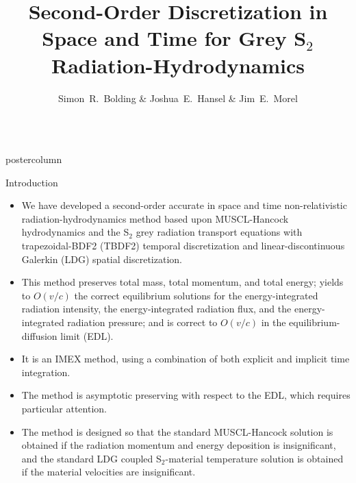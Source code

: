 \documentclass[xcolor=dvipsnames]{beamer}
\title{Second-Order Discretization in Space and Time for Grey S$_2$ Radiation-Hydrodynamics}
\author{\large Simon~R.~Bolding \& Joshua~E.~Hansel \& Jim~E.~Morel}
\institute{Department of Nuclear Engineering,
Texas A\&M University,
College Station, TX, USA 77843}
\newlength{\columnheight}
\begin{document}
\begin{frame}
\begin{columns}

\begin{column}{.49\textwidth}
\begin{beamercolorbox}[center,wd=\textwidth]{postercolumn}
\begin{minipage}[T]{0.95\textwidth} %
\parbox[t][\columnheight]{\textwidth}{ %
\begin{block}{Introduction}       
\begin{itemize}
\setlength{\itemsep}{0.2em}
\item We have developed a second-order accurate in space and time non-relativistic radiation-hydrodynamics method based upon 
MUSCL-Hancock hydrodynamics and the S$_2$ grey radiation transport equations with trapezoidal-BDF2 (TBDF2) temporal  
discretization and linear-discontinuous Galerkin (LDG) spatial discretization.
\item This method preserves total mass, total momentum, and total energy; yields to $O(v/c)$ the correct equilibrium solutions 
for the energy-integrated radiation intensity, the energy-integrated radiation flux, and the energy-integrated radiation 
pressure; and is correct to $O(v/c)$ in the equilibrium-diffusion limit (EDL).
\item It is an IMEX method, using a combination of both explicit and implicit time integration.
\item The method is asymptotic preserving with respect to the EDL, which requires particular attention.
\item The method is designed so that the standard MUSCL-Hancock solution is obtained if the radiation momentum and energy deposition 
is insignificant, and the standard LDG coupled S$_2$-material temperature solution is obtained if the material velocities are 
insignificant.
\end{itemize} 
\end{block}
        \vfill
         
}
\end{minipage}
\end{beamercolorbox}
\end{column}
\end{columns}
\end{frame}
\end{document}
